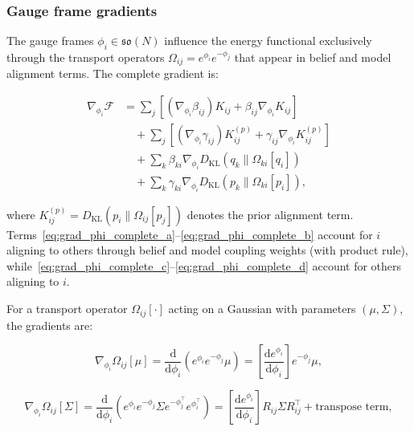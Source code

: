 \documentclass[twoside,11pt]{article}
\begin{document}
\subsubsection{Gauge frame gradients}

The gauge frames $\phi_i \in \mathfrak{so}(N)$ influence the energy functional exclusively through the transport operators $\Omega_{ij} = e^{\phi_i} e^{-\phi_j}$ that appear in belief and model alignment terms. The complete gradient is:

\begin{align}
\nabla_{\phi_i} \mathcal{F} &=
\sum_j \left[(\nabla_{\phi_i} \beta_{ij}) K_{ij} + \beta_{ij} \nabla_{\phi_i} K_{ij}\right] \label{eq:grad_phi_complete_a} \\
&\quad + \sum_j \left[(\nabla_{\phi_i} \gamma_{ij}) K_{ij}^{(p)} + \gamma_{ij} \nabla_{\phi_i} K_{ij}^{(p)}\right] \label{eq:grad_phi_complete_b} \\
&\quad + \sum_k \beta_{ki} \nabla_{\phi_i} D_{\mathrm{KL}}(q_k \| \Omega_{ki}[q_i]) \label{eq:grad_phi_complete_c} \\
&\quad + \sum_k \gamma_{ki} \nabla_{\phi_i} D_{\mathrm{KL}}(p_k \| \Omega_{ki}[p_i]), \label{eq:grad_phi_complete_d}
\end{align}

where $K_{ij}^{(p)} = D_{\mathrm{KL}}(p_i \| \Omega_{ij}[p_j])$ denotes the prior alignment term. Terms~\eqref{eq:grad_phi_complete_a}--\eqref{eq:grad_phi_complete_b} account for $i$ aligning to others through belief and model coupling weights (with product rule), while~\eqref{eq:grad_phi_complete_c}--\eqref{eq:grad_phi_complete_d} account for others aligning to $i$.

For a transport operator $\Omega_{ij}[\cdot]$ acting on a Gaussian with parameters $(\mu, \Sigma)$, the gradients are:

\begin{equation}
\nabla_{\phi_i} \Omega_{ij}[\mu] = \frac{\mathrm{d}}{\mathrm{d}\phi_i}\left(e^{\phi_i} e^{-\phi_j} \mu\right) = \left[\frac{\mathrm{d} e^{\phi_i}}{\mathrm{d}\phi_i}\right] e^{-\phi_j} \mu,
\label{eq:grad_phi_transport_mu}
\end{equation}

\begin{equation}
\nabla_{\phi_i} \Omega_{ij}[\Sigma] = \frac{\mathrm{d}}{\mathrm{d}\phi_i}\left(e^{\phi_i} e^{-\phi_j} \Sigma e^{-\phi_j^\top} e^{\phi_i^\top}\right) = \left[\frac{\mathrm{d} e^{\phi_i}}{\mathrm{d}\phi_i}\right] R_{ij} \Sigma R_{ij}^\top + \text{transpose term},
\label{eq:grad_phi_transport_sigma}
\end{equation}
\end{document}

